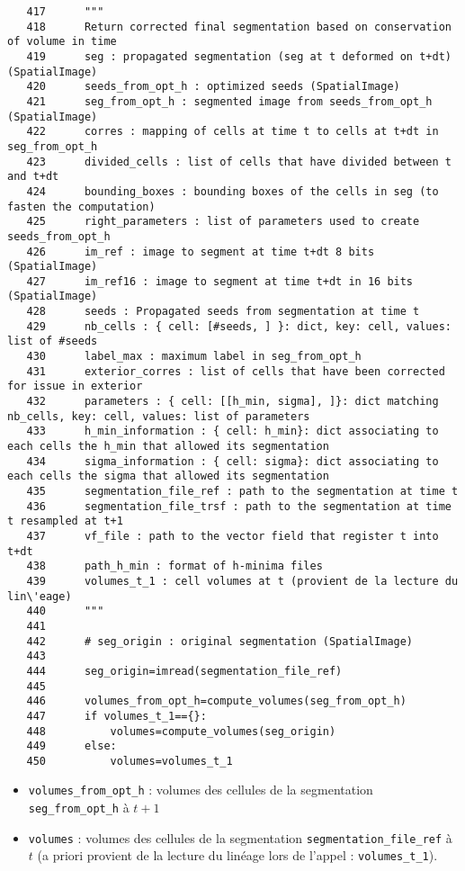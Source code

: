 \documentclass{article}
\def \mycolor {red}
\begin{document}
\begin{verbatim} 
   417	    """
   418	    Return corrected final segmentation based on conservation of volume in time
   419	    seg : propagated segmentation (seg at t deformed on t+dt) (SpatialImage)
   420	    seeds_from_opt_h : optimized seeds (SpatialImage)
   421	    seg_from_opt_h : segmented image from seeds_from_opt_h (SpatialImage)
   422	    corres : mapping of cells at time t to cells at t+dt in seg_from_opt_h
   423	    divided_cells : list of cells that have divided between t and t+dt
   424	    bounding_boxes : bounding boxes of the cells in seg (to fasten the computation)
   425	    right_parameters : list of parameters used to create seeds_from_opt_h
   426	    im_ref : image to segment at time t+dt 8 bits (SpatialImage)
   427	    im_ref16 : image to segment at time t+dt in 16 bits (SpatialImage)
   428	    seeds : Propagated seeds from segmentation at time t
   429	    nb_cells : { cell: [#seeds, ] }: dict, key: cell, values: list of #seeds
   430	    label_max : maximum label in seg_from_opt_h
   431	    exterior_corres : list of cells that have been corrected for issue in exterior
   432	    parameters : { cell: [[h_min, sigma], ]}: dict matching nb_cells, key: cell, values: list of parameters
   433	    h_min_information : { cell: h_min}: dict associating to each cells the h_min that allowed its segmentation
   434	    sigma_information : { cell: sigma}: dict associating to each cells the sigma that allowed its segmentation
   435	    segmentation_file_ref : path to the segmentation at time t
   436	    segmentation_file_trsf : path to the segmentation at time t resampled at t+1 
   437	    vf_file : path to the vector field that register t into t+dt
   438	    path_h_min : format of h-minima files
   439	    volumes_t_1 : cell volumes at t (provient de la lecture du lin\'eage)
   440	    """
   441	
   442	    # seg_origin : original segmentation (SpatialImage)
   443	
   444	    seg_origin=imread(segmentation_file_ref)
   445	
   446	    volumes_from_opt_h=compute_volumes(seg_from_opt_h)
   447	    if volumes_t_1=={}:
   448	        volumes=compute_volumes(seg_origin)
   449	    else:
   450	        volumes=volumes_t_1
\end{verbatim} 
\color{\mycolor}
\begin{itemize}
\itemsep -0.5ex
\item \verb|volumes_from_opt_h| : volumes des cellules de la segmentation \verb|seg_from_opt_h| \`a $t+1$
\item \verb|volumes| : volumes des cellules de la segmentation \verb|segmentation_file_ref| \`a $t$ 
(a priori provient de la lecture du lin\'eage lors de l'appel : \verb|volumes_t_1|).
\end{itemize}
\end{document}
